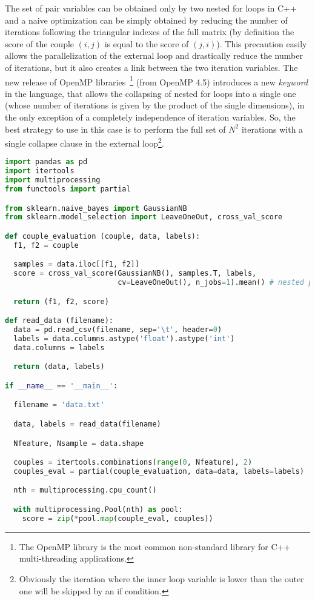 \documentclass{standalone}
\begin{document}
The set of pair variables can be obtained only by two nested for loops in \textsf{C++} and a naive optimization can be simply obtained by reducing the number of iterations following the triangular indexes of the full matrix (by definition the score of the couple $(i, j)$ is equal to the score of $(j, i)$).
This precaution easily allows the parallelization of the external loop and drastically reduce the number of iterations, but it also creates a link between the two iteration variables.
The new release of OpenMP libraries~\cite{OpenMP}\footnote{
  The OpenMP library is the most common non-standard library for \textsf{C++} multi-threading applications.
} (from OpenMP 4.5) introduces a new \emph{keyword} in the language, that allows the collapsing of nested for loops into a single one (whose number of iterations is given by the product of the single dimensions), in the only exception of a completely independence of iteration variables.
So, the best strategy to use in this case is to perform the full set of $N^2$ iterations with a single \textsf{collapse} clause in the external loop\footnote{
  Obviously the iteration where the inner loop variable is lower than the outer one will be skipped by an if condition.
}.

\lstset{style=snippet}
\begin{lstlisting}[language=Python, caption=Python parallel couples evaluation algorithm, label=code:py_couples]
import pandas as pd
import itertools
import multiprocessing
from functools import partial

from sklearn.naive_bayes import GaussianNB
from sklearn.model_selection import LeaveOneOut, cross_val_score

def couple_evaluation (couple, data, labels):
  f1, f2 = couple

  samples = data.iloc[[f1, f2]]
  score = cross_val_score(GaussianNB(), samples.T, labels,
                          cv=LeaveOneOut(), n_jobs=1).mean() # nested parallel loops are not allowed

  return (f1, f2, score)

def read_data (filename):
  data = pd.read_csv(filename, sep='\t', header=0)
  labels = data.columns.astype('float').astype('int')
  data.columns = labels

  return (data, labels)

if __name__ == '__main__':

  filename = 'data.txt'

  data, labels = read_data(filename)

  Nfeature, Nsample = data.shape

  couples = itertools.combinations(range(0, Nfeature), 2)
  couples_eval = partial(couple_evaluation, data=data, labels=labels)

  nth = multiprocessing.cpu_count()

  with multiprocessing.Pool(nth) as pool:
    score = zip(*pool.map(couple_eval, couples))

\end{lstlisting}
\end{document}
